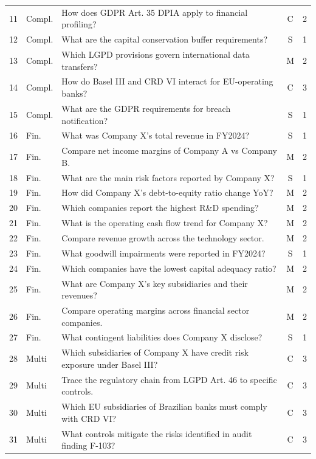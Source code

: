 \documentclass[review]{elsarticle}
\begin{document}
\begin{longtable}{@{}clp{6cm}cc@{}}
11 & Compl. & How does GDPR Art. 35 DPIA apply to financial profiling? & C & 2 \\
12 & Compl. & What are the capital conservation buffer requirements? & S & 1 \\
13 & Compl. & Which LGPD provisions govern international data transfers? & M & 2 \\
14 & Compl. & How do Basel III and CRD VI interact for EU-operating banks? & C & 3 \\
15 & Compl. & What are the GDPR requirements for breach notification? & S & 1 \\
16 & Fin. & What was Company X's total revenue in FY2024? & S & 1 \\
17 & Fin. & Compare net income margins of Company A vs Company B. & M & 2 \\
18 & Fin. & What are the main risk factors reported by Company X? & S & 1 \\
19 & Fin. & How did Company X's debt-to-equity ratio change YoY? & M & 2 \\
20 & Fin. & Which companies report the highest R\&D spending? & M & 2 \\
21 & Fin. & What is the operating cash flow trend for Company X? & M & 2 \\
22 & Fin. & Compare revenue growth across the technology sector. & M & 2 \\
23 & Fin. & What goodwill impairments were reported in FY2024? & S & 1 \\
24 & Fin. & Which companies have the lowest capital adequacy ratio? & M & 2 \\
25 & Fin. & What are Company X's key subsidiaries and their revenues? & M & 2 \\
26 & Fin. & Compare operating margins across financial sector companies. & M & 2 \\
27 & Fin. & What contingent liabilities does Company X disclose? & S & 1 \\
28 & Multi & Which subsidiaries of Company X have credit risk exposure under Basel III? & C & 3 \\
29 & Multi & Trace the regulatory chain from LGPD Art. 46 to specific controls. & C & 3 \\
30 & Multi & Which EU subsidiaries of Brazilian banks must comply with CRD VI? & C & 3 \\
31 & Multi & What controls mitigate the risks identified in audit finding F-103? & C & 3 \\

\end{longtable}
\end{document}
